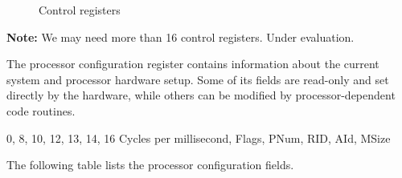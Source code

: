 \begin{figure}[H]
\begin{center}
\end{center}
\caption{Control registers}
\label{fig:Control registers}
\end{figure}

\textbf{Note:} We may need more than 16 control registers. Under evaluation.


The processor configuration register contains information about the current system and processor hardware setup. Some of its fields are read-only and set directly by the hardware, while others can be modified by processor-dependent code routines.

\begin{center}
\drawInstrFormatSixtyFour
  	{0, 8, 10, 12, 13, 14, 16}
  	{Cycles per millisecond, Flags,  PNum, RID, AId, MSize }
\end{center}

The following table lists the processor configuration fields. 

